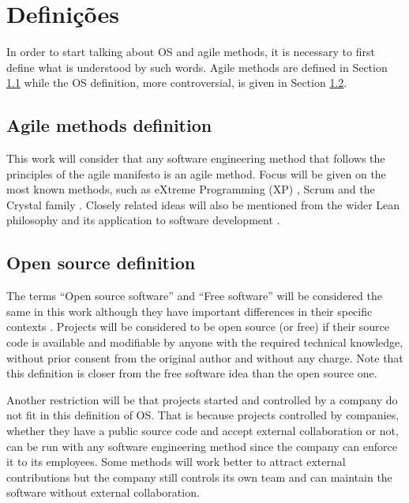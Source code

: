 \chapter{Definições}
\label{cap:definicoes}

In order to start talking about OS and agile methods, it is necessary
to first define what is understood by such words. Agile methods are
defined in Section \ref{sec:agile-def} while the OS definition,
more controversial, is given in Section \ref{sec:os-def}.

\section{Agile methods definition}
\label{sec:agile-def}

This work will consider that any software engineering method that
follows the principles of the agile manifesto \cite{AgileManifesto} is
an agile method. Focus will be given on the most known methods, such
as eXtreme Programming (XP) \cite{XP02}, Scrum \cite{Schwaber2004} and
the Crystal family \cite{Cockburn2002}. Closely related ideas will
also be mentioned from the wider Lean philosophy \cite{Ohno1998} and
its application to software development \cite{Poppendieck2005}.

\section{Open source definition}
\label{sec:os-def}

The terms ``Open source software'' and ``Free software'' will be
considered the same in this work although they have important
differences in their specific contexts \cite[Ch. 1, Free Versus Open
source]{Fogel2005}. Projects will be considered to be open source (or
free) if their source code is available and modifiable by anyone with
the required technical knowledge, without prior consent from the
original author and without any charge. Note that this definition is
closer from the free software idea than the open source one.

Another restriction will be that projects started and controlled by a
company do not fit in this definition of OS. That is because projects
controlled by companies, whether they have a public source code and
accept external collaboration or not, can be run with any software
engineering method since the company can enforce it to its
employees. Some methods will work better to attract external
contributions but the company still controls its own team and can
maintain the software without external collaboration.

